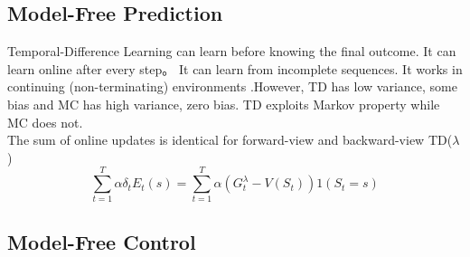 \documentclass[10pt,twocolumn,letterpaper]{article}
\begin{document}
\subsection{Model-Free Prediction}

Temporal-Difference Learning can learn before knowing the final outcome. It can learn online after every step。 It can learn from incomplete sequences. It works in continuing (non-terminating) environments .However, TD has low variance, some bias and MC has high variance, zero bias. TD exploits Markov property while MC does not.\\
The sum of online updates is identical for forward-view and backward-view TD($\lambda$)
\begin{equation}
	\sum_{t=1}^{T}\alpha \delta_tE_t(s) = \sum_{t=1}^{T}\alpha (G_t^\lambda-V(S_t))1(S_t=s)
\end{equation}

\subsection{Model-Free Control}
\end{document}

